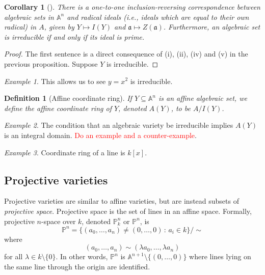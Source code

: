 \documentclass[12pt]{amsart}
\newcommand{\An}{\mathbb{A}^n}
\newcommand{\Pn}{\mathbb{P}^n}
\renewcommand{\a}{\mathfrak{a}}
\newtheorem{definition}[theorem]{Definition}
\newtheorem{corollary}[theorem]{Corollary}
\theoremstyle{remark}
\theoremstyle{remark}
\newtheorem*{example}{Example}
\begin{document}
\begin{corollary}[{\cite[Coro 1.4]{Hartshorne77}}]
There is a one-to-one inclusion-reversing correspondence between algebraic sets in $\An$ and radical ideals (i.e., ideals which are equal to their own radical) in $A$, given by $Y \mapsto I(Y)$ and $\a \mapsto Z(\a)$.
Furthermore, an algebraic set is irreducible if and only if its ideal is prime.
\end{corollary}
\begin{proof}
The first sentence is a direct consequence of (i), (ii), (iv) and (v) in the previous proposition.
Suppose $Y$ is irreducible.

\end{proof}

\begin{example}
This allows us to see $y = x^2$ is irreducible.
\end{example}

\begin{definition}[Affine coordinate ring]
If $Y \subseteq \An$ is an affine algebraic set, we define the affine coordinate ring of $Y$, denoted $A(Y)$, to be $A/I(Y)$.
\end{definition}

\begin{example}
The condition that an algebraic variety be irreducible implies $A(Y)$ is an integral domain.
\textcolor{red}{Do an example and a counter-example}.
\end{example}

\begin{example}
Coordinate ring of a line is $k[x]$.
\end{example}

\subsection{Projective varieties}
Projective varieties are similar to affine varieties, but are instead subsets of \emph{projective space}.
Projective space is the set of lines in an affine space.
Formally, projective $n$-space over $k$, denoted $\Pn_k$ or $\Pn$, is
$$\Pn = \{(a_0, \ldots, a_n) \ne (0, \ldots, 0) \, : \, a_i \in k \} / \sim$$
where
$$(a_0, \ldots, a_n) \sim (\lambda a_0, \ldots, \lambda a_n)$$
for all $\lambda \in k \setminus \{0\}$.
In other words, $\Pn$ is $\mathbb{A}^{n+1} \setminus \{(0, \ldots, 0)\}$ where lines lying on the same line through the origin are identified.
\end{document}
